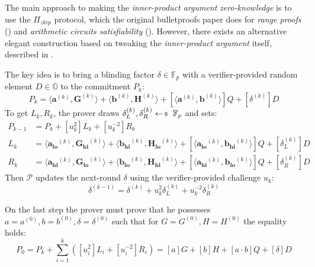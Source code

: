 \documentclass[../../book.tex]{subfiles}
\begin{document}
The main approach to making the \textit{inner-product argument} \textit{zero-knowledge} is to use the $\Pi_{zkip}$ protocol, which the original bulletproofs paper \cite{bulletproofs} does for \textit{range proofs} () and \textit{arithmetic circuits satisfiability} (). However, there exists an alternative elegant construction based on tweaking the \textit{inner-product argument} itself, described in \cite[Appendix E.2]{pvss}.

The key idea is to bring a blinding factor $\delta \in \mathbb{F}_p$ with a verifier-provided random element $D \in \mathbb{G}$ to the commitment $P_k$:
$$ P_k = \langle \mathbf{a}^{(k)}, \mathbf{G}^{(k)} \rangle + \langle \mathbf{b}^{(k)}, \mathbf{H}^{(k)} \rangle + [\langle \mathbf{a}^{(k)}, \mathbf{b}^{(k)} \rangle]Q + [\delta^{(k)}]D $$
To get $L_k, R_k$, the prover draws $\delta^{(k)}_L, \delta^{(k)}_R \leftarrowS \mathbb{F}_p$ and sets:
\begin{align*}
    P_{k-1} &= P_k + [u_k^2] L_k + [u_k^{-2}] R_k \\
    L_{k} &= \langle \mathbf{a_{lo}}^{(k)}, \mathbf{G_{hi}}^{(k)}\rangle + \langle \mathbf{b_{hi}}^{(k)}, \mathbf{H_{lo}}^{(k)}\rangle + [\langle \mathbf{a_{lo}}^{(k)}, \mathbf{b_{hi}}^{(k)}\rangle]Q + [\delta^{(k)}_L]D \\
    R_{k} &= \langle \mathbf{a_{hi}}^{(k)}, \mathbf{G_{lo}}^{(k)}\rangle + \langle \mathbf{b_{lo}}^{(k)}, \mathbf{H_{hi}}^{(k)}\rangle + [\langle \mathbf{a_{hi}}^{(k)}, \mathbf{b_{lo}}^{(k)}\rangle]Q + [\delta^{(k)}_R]D
\end{align*}
Then $\mathcal{P}$ updates the next-round $\delta$ using the verifier-provided challenge $u_k$:
$$\delta^{(k-1)} = \delta^{(k)} + u_k^2\delta^{(k)}_L + u_k^{-2}\delta^{(k)}_R$$

On the last step the prover must prove that he possesses $a = a^{(0)}, b = b^{(0)}, \delta = \delta^{(0)}$ such that for $G = G^{(0)}, H = H^{(0)}$ the equality holds:
\begin{equation*}
    P_0 = P_k + \sum_{i=1}^k ([u_i^2]L_i + [u_i^{-2}]R_i) = [a]G + [b]H + [a\cdot b]Q + [\delta]D
\end{equation*}
\end{document}
